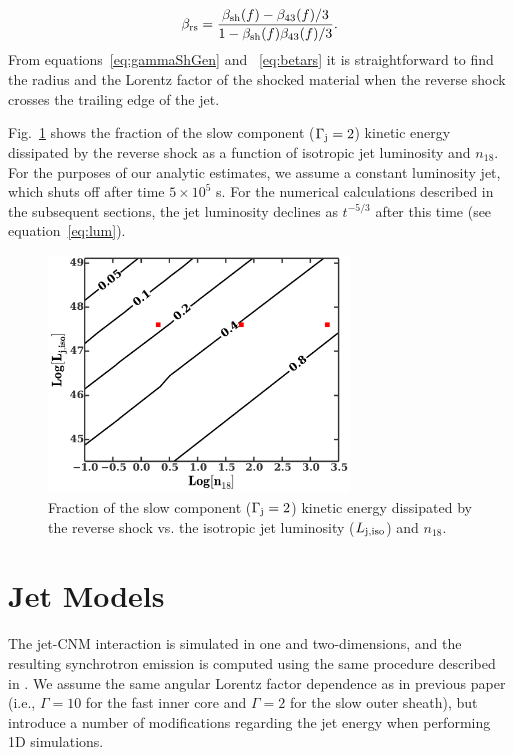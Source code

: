 \documentclass[usenatbib,fleqn]{mnras}
\begin{document}
\begin{equation}
\beta_{\rm rs}=\frac{\beta_{\rm sh}(f)-\beta_{43}(f)/3}{1-\beta_{\rm
    sh}(f) \beta_{43}(f)/3}.
\label{eq:betars}
\end{equation} 
%
From equations~\eqref{eq:gammaShGen} and ~\eqref{eq:betars} it is
straightforward to find the radius and the Lorentz factor of the
shocked material when the reverse shock crosses the trailing edge of
the jet.

Fig.~\ref{fig:diss} shows the fraction of the slow component
($\Gamma_{\rm j}=2$) kinetic energy dissipated by the reverse shock as a
function of isotropic jet luminosity and $n_{18}$. For the purposes of
our analytic estimates, we assume a constant luminosity jet, which
shuts off after time $5 \times 10^{5}$ s. For the numerical
calculations described in the subsequent sections, the jet luminosity
declines as $t^{-5/3}$ after this time (see equation~\ref{eq:lum}).

\begin{figure}
\includegraphics[width=8cm]{diss.pdf}
\caption{\label{fig:diss} Fraction of the slow component
  ($\Gamma_{\rm j}=2$) kinetic energy dissipated by the reverse shock
  vs. the isotropic jet luminosity ($L_{\rm j,iso}$) and $n_{18}$.}
\end{figure}


\section{Jet Models}
\label{sec:numerical}

The jet-CNM interaction is simulated in one and two-dimensions, and
the resulting synchrotron emission is computed using the same
procedure described in \citet{Mimica+2015}. We assume the same angular
Lorentz factor dependence as in previous paper (i.e., $\Gamma = 10$
for the fast inner core and $\Gamma = 2$ for the slow outer sheath),
but introduce a number of modifications regarding the jet energy
when performing 1D simulations.
\end{document}
